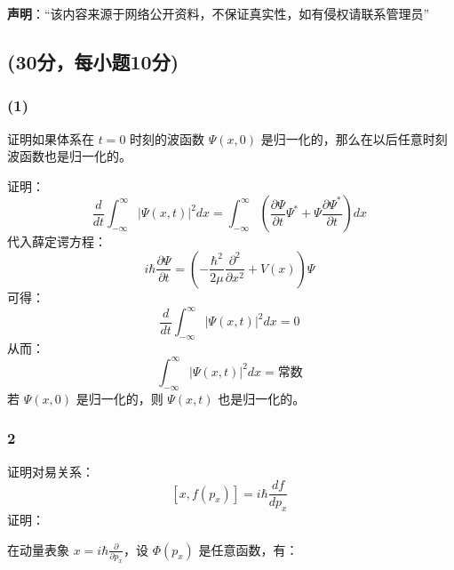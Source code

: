 
\textbf{声明}：“该内容来源于网络公开资料，不保证真实性，如有侵权请联系管理员”

\subsection{(30分，每小题10分)}
\subsubsection{(1)}
证明如果体系在 $t=0$ 时刻的波函数 $\Psi(x, 0)$ 是归一化的，那么在以后任意时刻波函数也是归一化的。

证明：
$$\frac{d}{dt} \int_{-\infty}^{\infty} \left| \Psi(x,t) \right|^2 dx = \int_{-\infty}^{\infty} \left( \frac{\partial \Psi}{\partial t} \Psi^* + \Psi \frac{\partial \Psi^*}{\partial t} \right) dx~$$
代入薛定谔方程：
$$i\hbar \frac{\partial \Psi}{\partial t} = \left( -\frac{\hbar^2}{2\mu} \frac{\partial^2}{\partial x^2} + V(x) \right) \Psi~$$
可得：
$$\frac{d}{dt} \int_{-\infty}^{\infty} \left| \Psi(x,t) \right|^2 dx = 0~$$
从而：
$$\int_{-\infty}^{\infty} \left| \Psi(x,t) \right|^2 dx = \text{常数}~$$
若 $\Psi(x, 0)$ 是归一化的，则 $\Psi(x,t)$ 也是归一化的。
\subsubsection{{2}}
证明对易关系：
$$\left[x, f(p_x)\right] = i\hbar \frac{df}{dp_x}~$$
证明：

在动量表象 $x = i\hbar \frac{\partial}{\partial p_x}$，设 $\Phi(p_x)$ 是任意函数，有：
